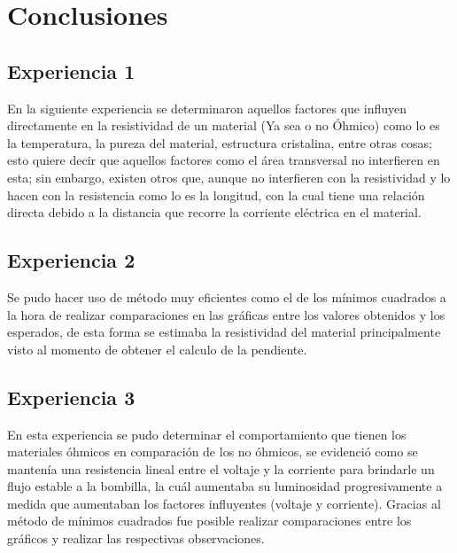 \documentclass[10pt]{article}
\begin{document}
\section{Conclusiones}

\subsection*{Experiencia 1}

En la siguiente experiencia se determinaron aquellos factores que influyen
directamente en la resistividad de un material (Ya sea o no Óhmico) como lo
es la temperatura, la pureza del material, estructura cristalina, entre otras
cosas; esto quiere decir que aquellos factores como el área transversal no
interfieren en esta; sin embargo, existen otros que, aunque no interfieren
con la resistividad y lo hacen con la resistencia como lo es la longitud,
con la cual tiene una relación directa debido a la distancia que recorre
la corriente eléctrica en el material.

\subsection*{Experiencia 2}

Se pudo hacer uso de método muy eficientes como el de los mínimos cuadrados
a la hora de realizar comparaciones en las gráficas entre los valores
obtenidos y los esperados, de esta forma se estimaba la resistividad 
del material principalmente visto al momento de obtener el calculo 
de la pendiente.

\subsection*{Experiencia 3}

En esta experiencia se pudo determinar el comportamiento que tienen los 
materiales óhmicos en comparación de los no óhmicos, se evidenció como 
se mantenía una resistencia lineal entre el voltaje y la corriente para 
brindarle un flujo estable a la bombilla, la cuál aumentaba su 
luminosidad progresivamente a medida que aumentaban los factores 
influyentes (voltaje y corriente). Gracias al método de mínimos 
cuadrados fue posible realizar comparaciones entre los gráficos 
y realizar las respectivas observaciones. 


\end{document}
